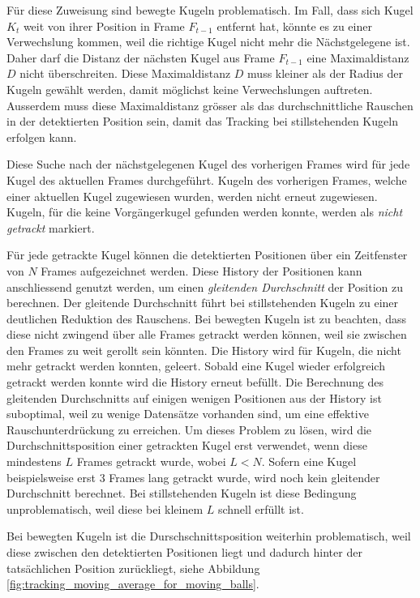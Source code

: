 Für diese Zuweisung sind bewegte Kugeln problematisch.
Im Fall, dass sich Kugel $K_{t}$ weit von ihrer Position in Frame $F_{t-1}$ entfernt hat,
könnte es zu einer Verwechslung kommen, weil die richtige Kugel nicht mehr die Nächstgelegene ist.
Daher darf die Distanz der nächsten Kugel aus Frame $F_{t-1}$ eine Maximaldistanz $D$ nicht überschreiten.
Diese Maximaldistanz $D$ muss kleiner als der Radius der Kugeln gewählt werden, damit möglichst keine Verwechslungen
auftreten. Ausserdem muss diese Maximaldistanz grösser als das durchschnittliche Rauschen in der detektierten Position
sein, damit das Tracking bei stillstehenden Kugeln erfolgen kann.

Diese Suche nach der nächstgelegenen Kugel des vorherigen Frames wird für jede Kugel des aktuellen Frames durchgeführt.
Kugeln des vorherigen Frames, welche einer aktuellen Kugel zugewiesen wurden, werden nicht erneut zugewiesen.
Kugeln, für die keine Vorgängerkugel gefunden werden konnte, werden als \emph{nicht getrackt} markiert.

Für jede getrackte Kugel können die detektierten Positionen über ein Zeitfenster von $N$ Frames aufgezeichnet werden.
Diese History der Positionen kann anschliessend genutzt werden, um einen \emph{gleitenden Durchschnitt}\cite{wiki:moving_average}
der Position zu berechnen.
Der gleitende Durchschnitt führt bei stillstehenden Kugeln zu einer deutlichen Reduktion des Rauschens.
Bei bewegten Kugeln ist zu beachten, dass diese nicht zwingend über alle Frames getrackt werden können,
weil sie zwischen den Frames zu weit gerollt sein könnten.
Die History wird für Kugeln, die nicht mehr getrackt werden konnten, geleert.
Sobald eine Kugel wieder erfolgreich getrackt werden konnte wird die History erneut befüllt.
Die Berechnung des gleitenden Durchschnitts auf einigen wenigen Positionen aus der History ist suboptimal, weil
zu wenige Datensätze vorhanden sind, um eine effektive Rauschunterdrückung zu erreichen.
Um dieses Problem zu lösen, wird die Durchschnittsposition einer getrackten Kugel erst verwendet,
wenn diese mindestens $L$ Frames getrackt wurde, wobei $L < N$.
Sofern eine Kugel beispielsweise erst 3 Frames lang getrackt wurde, wird noch kein gleitender Durchschnitt berechnet.
Bei stillstehenden Kugeln ist diese Bedingung unproblematisch, weil diese bei kleinem $L$ schnell erfüllt ist.

Bei bewegten Kugeln ist die Durschschnittsposition weiterhin problematisch, weil diese zwischen den detektierten Positionen liegt und
dadurch hinter der tatsächlichen Position zurückliegt, siehe Abbildung \ref{fig:tracking_moving_average_for_moving_balls}.

